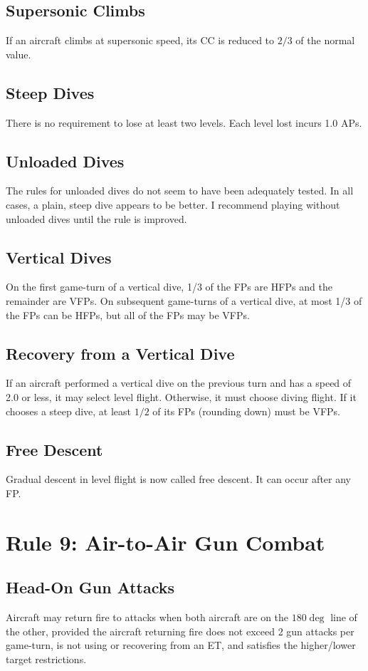 \documentclass[10pt]{extarticle}
\begin{document}
\subsection{Supersonic Climbs} If an aircraft climbs at supersonic speed, its CC is reduced to $2/3$ of the normal value.

\subsection{Steep Dives} There is no requirement to lose at least two levels. Each level lost incurs 1.0 APs.

\subsection{Unloaded Dives} The rules for unloaded dives do not seem to have been adequately tested. In all cases, a plain, steep dive appears to be better. I recommend playing without unloaded dives until the rule is improved.

\subsection{Vertical Dives} On the first game-turn of a vertical dive, 1/3 of the FPs are HFPs and the remainder are VFPs. On subsequent game-turns of a vertical dive, at most 1/3 of the FPs can be HFPs, but all of the FPs may be VFPs.

\subsection{Recovery from a Vertical Dive} If an aircraft performed a vertical dive on the previous turn and has a speed of 2.0 or less, it may select level flight. Otherwise, it must choose diving flight. If it chooses a steep dive, at least $1/2$ of its FPs (rounding down) must be VFPs.

\subsection{Free Descent} Gradual descent in level flight is now called free descent. It can occur after any FP.

\section{Rule 9: Air-to-Air Gun Combat}

\subsection{Head-On Gun Attacks} Aircraft may return fire to attacks when both aircraft are on the $180\deg$ line of the other, provided the aircraft returning fire does not exceed 2 gun attacks per game-turn, is not using or recovering from an ET, and satisfies the higher/lower target restrictions.
\end{document}

